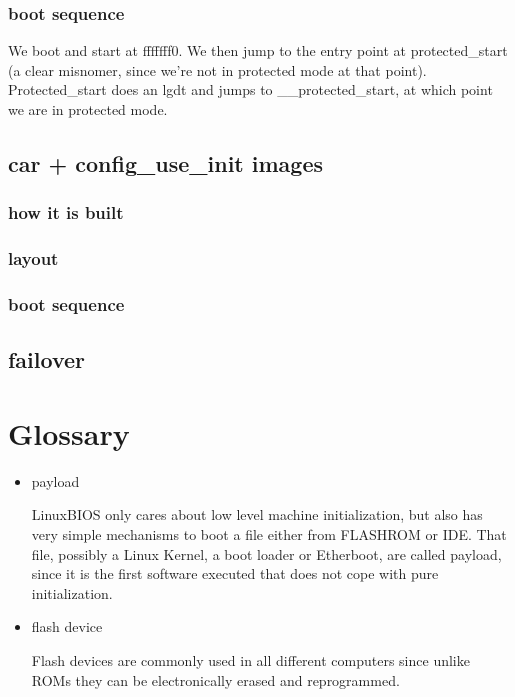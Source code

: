 \documentclass[titlepage,12pt]{article}
\begin{document}
\subsubsection{boot sequence}
We boot and start at fffffff0. We then jump to the entry point at protected\_start (a clear misnomer, since we're not in protected mode at that 
point). Protected\_start does an lgdt and jumps to \_\_protected\_start, at which point we are in protected mode. 

\subsection{car + config\_use\_init images}
\subsubsection{how it is built}
\subsubsection{layout}
\subsubsection{boot sequence}

\subsection{failover}

%
%

\section{Glossary}
\begin{itemize}
\item payload

LinuxBIOS only cares about low level machine initialization, but also has
very simple mechanisms to boot a file either from FLASHROM or IDE. That
file, possibly a Linux Kernel, a boot loader or Etherboot, are called
payload, since it is the first software executed that does not cope with
pure initialization.

\item flash device

Flash devices are commonly used in all different computers since unlike
ROMs they can be electronically erased and reprogrammed.
\end{itemize}

\newpage
\end{document}
